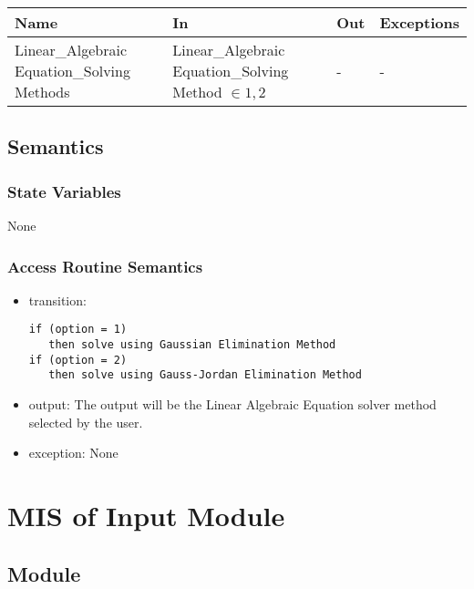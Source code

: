 \documentclass[12pt, titlepage]{article}
\begin{document}
\begin{center}
\begin{tabular}{p{4cm} p{4cm} p{2cm} p{2cm}}
\hline
\textbf{Name} & \textbf{In} & \textbf{Out} & \textbf{Exceptions} \\
\hline
Linear\_Algebraic Equation\_Solving Methods & Linear\_Algebraic
Equation\_Solving Method $\in {1, 2}$& - & - \\

\hline
\end{tabular}
\end{center}

\subsection{Semantics}

\subsubsection{State Variables}

None


\subsubsection{Access Routine Semantics}

\noindent %
\begin{itemize}
\item transition: \begin{lstlisting}
if (option = 1)
   then solve using Gaussian Elimination Method
if (option = 2)
   then solve using Gauss-Jordan Elimination Method 
\end{lstlisting}
\item output: The output will be the Linear Algebraic Equation solver method selected by the user.
\item exception: None%


\end{itemize}

\newpage


\section{MIS of {Input Module}} \label{modic} %

\subsection{Module}
\end{document}
